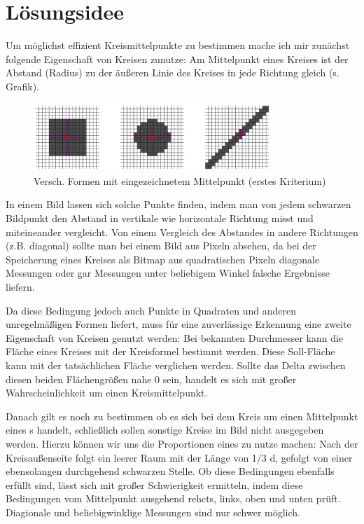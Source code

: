 \section{Lösungsidee}
Um möglichst effizient Kreismittelpunkte zu bestimmen mache ich mir zunächst folgende Eigenschaft von Kreisen zunutze: Am Mittelpunkt eines Kreises ist der Abstand (Radius) zu der äußeren Linie des Kreises in jede Richtung gleich (s. Grafik).

\begin{figure}[!ht]
	\centering	
	\includegraphics[width=0.8\textwidth]{durchmesservergleich}
	\caption{Versch. Formen mit eingezeichnetem Mittelpunkt (erstes Kriterium)}
\end{figure}

In einem Bild lassen sich solche Punkte finden, indem man von jedem schwarzen Bildpunkt den Abstand in vertikale wie horizontale Richtung misst und miteineander vergleicht. Von einem Vergleich des Abstandes in andere Richtungen (z.B. diagonal) sollte man bei einem Bild aus Pixeln absehen, da bei der Speicherung eines Kreises als Bitmap aus quadratischen Pixeln diagonale Messungen oder gar Messungen unter beliebigem Winkel falsche Ergebnisse liefern.

Da diese Bedingung jedoch auch Punkte in Quadraten und anderen unregelmäßigen Formen liefert, muss für eine zuverlässige Erkennung eine zweite Eigenschaft von Kreisen genutzt werden: Bei bekannten Durchmesser kann die Fläche eines Kreises mit der Kreisformel bestimmt werden. Diese Soll-Fläche kann mit der tatsächlichen Fläche verglichen werden. Sollte das Delta zwischen diesen beiden Flächengrößen nahe 0 sein, handelt es sich mit großer Wahrscheinlichkeit um einen Kreismittelpunkt.

Danach gilt es noch zu bestimmen ob es sich bei dem Kreis um einen Mittelpunkt eines \task{}s handelt, schließlich sollen sonstige Kreise im Bild nicht ausgegeben werden. Hierzu können wir uns die Proportionen eines  zu nutze machen: Nach der Kreisaußenseite folgt ein leerer Raum mit der Länge von 1/3 d, gefolgt von einer ebensolangen durchgehend schwarzen Stelle. Ob diese Bedingungen ebenfalls erfüllt sind, lässt sich mit großer Schwierigkeit ermitteln, indem diese Bedingungen vom Mittelpunkt ausgehend rehcts, links, oben und unten prüft. Diagionale und beliebigwinklige Messungen sind nur schwer möglich.

